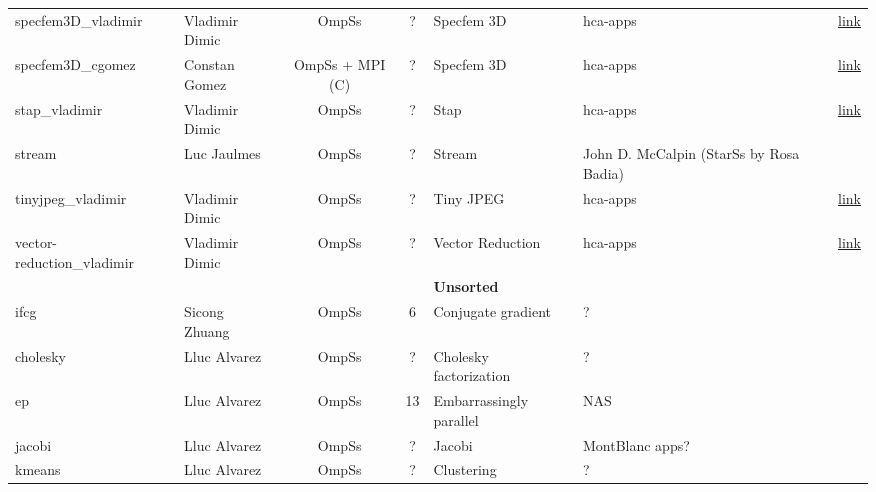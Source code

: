 \documentclass[landscape]{article}
\newcommand{\cm}{\ding{51}}%
\newcommand{\xm}{\ding{55}}%
\begin{document}
\begin{table}[h!]
{\begin{tabular}{@{}llccllcc@{}}
      {specfem3D\_vladimir         } & Vladimir Dimic     & OmpSs                 & ?  & Specfem 3D                                 & hca-apps                         & \xm & \hyperref[specfem3D_vladimir]{link}\\
      {specfem3D\_cgomez           } & Constan Gomez      & OmpSs + MPI (C)       & ?  & Specfem 3D                                 & hca-apps                         & \xm & \hyperref[specfem3D_cgomez]{link}\\
      {stap\_vladimir              } & Vladimir Dimic     & OmpSs                 & ?  & Stap                                       & hca-apps                         & \xm & \hyperref[stap_vladimir]{link}\\
      {stream                      } & Luc Jaulmes        & OmpSs                 & ?  & Stream                                     & John D. McCalpin (StarSs by Rosa Badia) & \cm & \\
      {tinyjpeg\_vladimir          } & Vladimir Dimic     & OmpSs                 & ?  & Tiny JPEG                                  & hca-apps                         & \xm & \hyperref[tinyjpeg_vladimir]{link}\\
      {vector-reduction\_vladimir  } & Vladimir Dimic     & OmpSs                 & ?  & Vector Reduction                           & hca-apps                         & \xm & \hyperref[vector-reduction_vladimir]{link}\\
      \hline
      & & & & \textbf{Unsorted} & & & \\
      \hline
      {ifcg                  } & Sicong Zhuang      & OmpSs                 & 6  & Conjugate gradient                         & ?                                & \xm & \\
      {cholesky                    } & Lluc Alvarez       & OmpSs                 & ?  & Cholesky factorization                     & ?                                & \xm & \\
      {ep                          } & Lluc Alvarez       & OmpSs                 & 13 & Embarrassingly parallel                    & NAS                              & \xm & \\
      {jacobi                      } & Lluc Alvarez       & OmpSs                 & ?  & Jacobi                                     & MontBlanc apps?                  & \xm & \\
      {kmeans                      } & Lluc Alvarez       & OmpSs                 & ?  & Clustering                                 & ?                                & \xm & \\

\end{tabular}}
\end{table}
\end{document}
